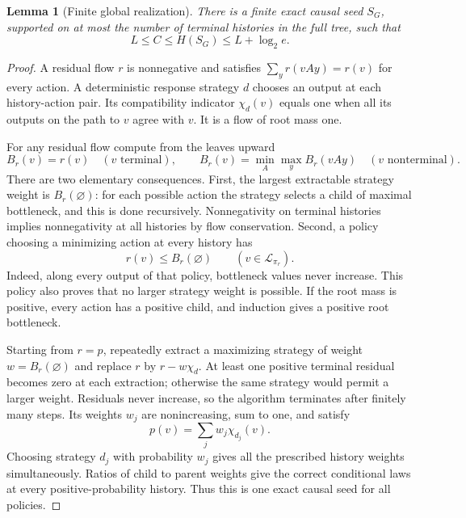 \documentclass[11pt,a4paper]{article}
\newtheorem{lemma}[theorem]{Lemma}
\begin{document}
\begin{lemma}[Finite global realization]\label{lem:realization}
There is a finite exact causal seed $S_G$, supported on at most the
number of terminal histories in the full tree, such that
\begin{equation}\label{eq:gap}
L\le C\le H(S_G)\le L+\log_2e.
\end{equation}
\end{lemma}
\begin{proof}
A residual flow $r$ is nonnegative and satisfies
$\sum_y r(vAy)=r(v)$ for every action. A deterministic response
strategy $d$ chooses an output at each history-action pair. Its
compatibility indicator $\chi_d(v)$ equals one when all its outputs
on the path to $v$ agree with $v$. It is a flow of root mass one.

For any residual flow compute from the leaves upward
\[
B_r(v)=r(v)\quad(v\text{ terminal}),\qquad
B_r(v)=\min_A\max_y B_r(vAy)\quad(v\text{ nonterminal}).
\]
There are two elementary consequences.
First, the largest extractable strategy weight is $B_r(\varnothing)$:
for each possible action the strategy selects a child of maximal
bottleneck, and this is done recursively. Nonnegativity on terminal
histories implies nonnegativity at all histories by flow conservation.
Second, a policy choosing a minimizing action at every history has
\[
r(v)\le B_r(\varnothing)\qquad(v\in\mathcal L_{\pi_r}).
\]
Indeed, along every output of that policy, bottleneck values never
increase. This policy also proves that no larger strategy weight is
possible. If the root mass is positive, every action has a positive
child, and induction gives a positive root bottleneck.

\pagebreak
Starting from $r=p$, repeatedly extract a maximizing strategy of weight
$w=B_r(\varnothing)$ and replace $r$ by $r-w\chi_d$. At least one
positive terminal residual becomes zero at each extraction; otherwise
the same strategy would permit a larger weight. Residuals never
increase, so the algorithm terminates after finitely many steps. Its
weights $w_j$ are nonincreasing, sum to one, and satisfy
\begin{equation}\label{eq:decomp}
p(v)=\sum_jw_j\chi_{d_j}(v).
\end{equation}
Choosing strategy $d_j$ with probability $w_j$ gives all the prescribed
history weights simultaneously. Ratios of child to parent weights
give the correct conditional laws at every positive-probability history.
Thus this is one exact causal seed for all policies.


\end{proof}
\end{document}
